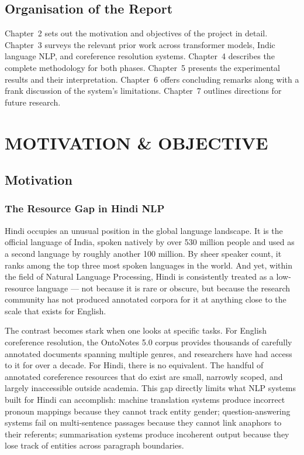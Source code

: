 \documentclass[12pt,a4paper]{report}
\begin{document}
\section{Organisation of the Report}

Chapter~2 sets out the motivation and objectives of the project in detail. Chapter~3 surveys the relevant prior work across transformer models, Indic language NLP, and coreference resolution systems. Chapter~4 describes the complete methodology for both phases. Chapter~5 presents the experimental results and their interpretation. Chapter~6 offers concluding remarks along with a frank discussion of the system's limitations. Chapter~7 outlines directions for future research.


\chapter{MOTIVATION \& OBJECTIVE}

\section{Motivation}

\subsection{The Resource Gap in Hindi NLP}

Hindi occupies an unusual position in the global language landscape. It is the official language of India, spoken natively by over 530 million people and used as a second language by roughly another 100 million. By sheer speaker count, it ranks among the top three most spoken languages in the world. And yet, within the field of Natural Language Processing, Hindi is consistently treated as a low-resource language --- not because it is rare or obscure, but because the research community has not produced annotated corpora for it at anything close to the scale that exists for English.

The contrast becomes stark when one looks at specific tasks. For English coreference resolution, the OntoNotes 5.0 corpus provides thousands of carefully annotated documents spanning multiple genres, and researchers have had access to it for over a decade. For Hindi, there is no equivalent. The handful of annotated coreference resources that do exist are small, narrowly scoped, and largely inaccessible outside academia. This gap directly limits what NLP systems built for Hindi can accomplish: machine translation systems produce incorrect pronoun mappings because they cannot track entity gender; question-answering systems fail on multi-sentence passages because they cannot link anaphors to their referents; summarisation systems produce incoherent output because they lose track of entities across paragraph boundaries.
\end{document}
